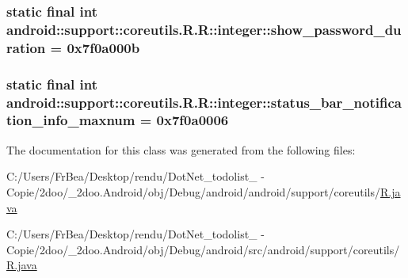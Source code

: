 \hypertarget{classandroid_1_1support_1_1coreutils_1_1_r_1_1integer_fd283d99cd17725ca75f4daefda58702}{
\subsubsection[{show\_\-password\_\-duration}]{\setlength{\rightskip}{0pt plus 5cm}static final int android::support::coreutils.R.R::integer::show\_\-password\_\-duration = 0x7f0a000b}}
\label{classandroid_1_1support_1_1coreutils_1_1_r_1_1integer_fd283d99cd17725ca75f4daefda58702}


\hypertarget{classandroid_1_1support_1_1coreutils_1_1_r_1_1integer_18694a863f933045eab121322f7b3781}{
\subsubsection[{status\_\-bar\_\-notification\_\-info\_\-maxnum}]{\setlength{\rightskip}{0pt plus 5cm}static final int android::support::coreutils.R.R::integer::status\_\-bar\_\-notification\_\-info\_\-maxnum = 0x7f0a0006}}
\label{classandroid_1_1support_1_1coreutils_1_1_r_1_1integer_18694a863f933045eab121322f7b3781}




The documentation for this class was generated from the following files:\begin{CompactItemize}
\item 
C:/Users/FrBea/Desktop/rendu/DotNet\_\-todolist\_ - Copie/2doo/\_\-2doo.Android/obj/Debug/android/android/support/coreutils/\hyperlink{android_2support_2coreutils_2_r_8java}{R.java}\item 
C:/Users/FrBea/Desktop/rendu/DotNet\_\-todolist\_ - Copie/2doo/\_\-2doo.Android/obj/Debug/android/src/android/support/coreutils/\hyperlink{src_2android_2support_2coreutils_2_r_8java}{R.java}\end{CompactItemize}
